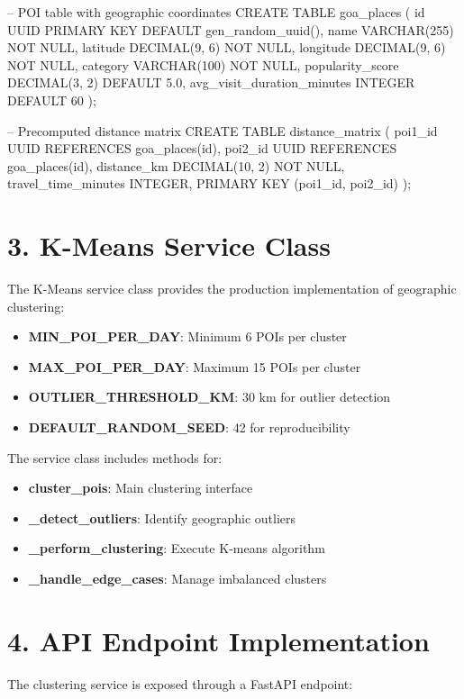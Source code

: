 \begin{sql}
-- POI table with geographic coordinates
CREATE TABLE goa_places (
    id UUID PRIMARY KEY DEFAULT gen_random_uuid(),
    name VARCHAR(255) NOT NULL,
    latitude DECIMAL(9, 6) NOT NULL,
    longitude DECIMAL(9, 6) NOT NULL,
    category VARCHAR(100) NOT NULL,
    popularity_score DECIMAL(3, 2) DEFAULT 5.0,
    avg_visit_duration_minutes INTEGER DEFAULT 60
);

-- Precomputed distance matrix
CREATE TABLE distance_matrix (
    poi1_id UUID REFERENCES goa_places(id),
    poi2_id UUID REFERENCES goa_places(id),
    distance_km DECIMAL(10, 2) NOT NULL,
    travel_time_minutes INTEGER,
    PRIMARY KEY (poi1_id, poi2_id)
);
\end{sql}

\section{3. K-Means Service Class}

The K-Means service class provides the production implementation of geographic clustering:

\begin{itemize}
\item \textbf{MIN\_POI\_PER\_DAY}: Minimum 6 POIs per cluster
\item \textbf{MAX\_POI\_PER\_DAY}: Maximum 15 POIs per cluster
\item \textbf{OUTLIER\_THRESHOLD\_KM}: 30 km for outlier detection
\item \textbf{DEFAULT\_RANDOM\_SEED}: 42 for reproducibility
\end{itemize}

The service class includes methods for:
\begin{itemize}
\item \textbf{cluster\_pois}: Main clustering interface
\item \textbf{\_detect\_outliers}: Identify geographic outliers
\item \textbf{\_perform\_clustering}: Execute K-means algorithm
\item \textbf{\_handle\_edge\_cases}: Manage imbalanced clusters
\end{itemize}

\section{4. API Endpoint Implementation}

The clustering service is exposed through a FastAPI endpoint:


